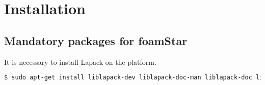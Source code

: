 \chapter{Installation}


\section{Mandatory packages for foamStar}

It is necessary to install Lapack on the platform.
\begin{lstlisting}[language=bash]
  $ sudo apt-get install liblapack-dev liblapack-doc-man liblapack-doc liblapack-pic liblapack3 liblapack-test liblapack3gf liblapacke liblapacke-dev
\end{lstlisting}

